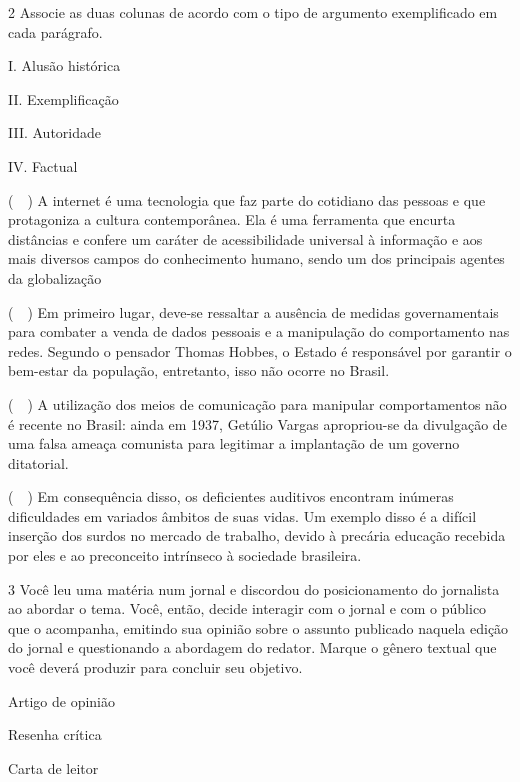 \num{2} Associe as duas colunas de acordo com o tipo de argumento
exemplificado em cada parágrafo.

\begin{multicols}{2}
I. Alusão histórica 

II. Exemplificação

III. Autoridade

IV. Factual
\columnbreak

(~~) A internet é uma tecnologia que faz
parte do cotidiano das pessoas e que protagoniza a cultura
contemporânea. Ela é uma ferramenta que encurta distâncias e confere um
caráter de acessibilidade universal à informação e aos mais diversos
campos do conhecimento humano, sendo um dos principais agentes da
globalização 

(~~) Em primeiro lugar,
deve-se ressaltar a ausência de medidas governamentais para combater a
venda de dados pessoais e a manipulação do comportamento nas redes.
Segundo o pensador Thomas Hobbes, o Estado é responsável por garantir o
bem-estar da população, entretanto, isso não ocorre no Brasil.

(~~) A utilização dos meios de comunicação para
manipular comportamentos não é recente no Brasil: ainda em 1937, Getúlio
Vargas apropriou-se da divulgação de uma falsa ameaça comunista para
legitimar a implantação de um governo ditatorial. 

(~~) Em consequência disso, os deficientes auditivos
encontram inúmeras dificuldades em variados âmbitos de suas vidas. Um
exemplo disso é a difícil inserção dos surdos no mercado de trabalho,
devido à precária educação recebida por eles e ao preconceito intrínseco
à sociedade brasileira.
\end{multicols}

\num{3} Você leu uma matéria num jornal e discordou do posicionamento do
jornalista ao abordar o tema. Você, então, decide interagir com o jornal
e com o público que o acompanha, emitindo sua opinião sobre o assunto
publicado naquela edição do jornal e questionando a abordagem do
redator. Marque o gênero textual que você deverá produzir para concluir
seu objetivo.

\begin{boxlist}

\boxitem{}  Artigo de opinião

\boxitem{} Resenha crítica

 Carta de leitor

\end{boxlist}

